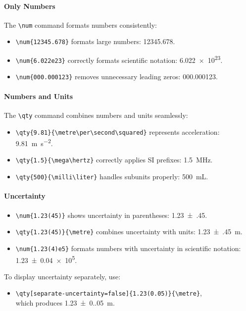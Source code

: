     \paragraph*{Only Numbers}

    The \verb|\num| command formats numbers consistently:
    \begin{itemize}
        \item \verb|\num{12345.678}| formats large numbers: \num{12345.678}.
        \item \verb|\num{6.022e23}| correctly formats scientific notation: \num{6.022e23}.
        \item \verb|\num{000.000123}| removes unnecessary leading zeros: \num{000.000123}.
    \end{itemize}

    \paragraph*{Numbers and Units}

    The \verb|\qty| command combines numbers and units seamlessly:
    \begin{itemize}
        \item \verb|\qty{9.81}{\metre\per\second\squared}| represents acceleration: \qty{9.81}{\metre\per\second\squared}.
        \item \verb|\qty{1.5}{\mega\hertz}| correctly applies SI prefixes: \qty{1.5}{\mega\hertz}.
        \item \verb|\qty{500}{\milli\liter}| handles subunits properly: \qty{500}{\milli\liter}.
    \end{itemize}

    \paragraph*{Uncertainty}

    \begin{itemize}
        \item \verb|\num{1.23(45)}| shows uncertainty in parentheses: \num{1.23(45)}.
        \item \verb|\qty{1.23(45)}{\metre}| combines uncertainty with units: \qty{1.23(45)}{\metre}.
        \item \verb|\num{1.23(4)e5}| formats numbers with uncertainty in scientific notation: \num{1.23(4)e5}.
    \end{itemize}
    To display uncertainty separately, use:
    \begin{itemize}
        \item \verb|\qty[separate-uncertainty=false]{1.23(0.05)}{\metre}|, \\
        which produces \qty[separate-uncertainty=false]{1.23(0.05)}{\metre}.
    \end{itemize}


